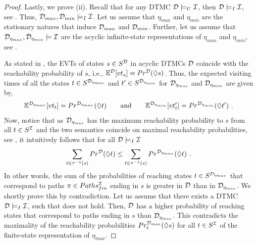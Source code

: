 \begin{proof}

    Lastly, we prove (ii).
    Recall that for any DTMC $\mathcal{D} \models_U \mathcal{I}$, then $\mathcal{D} \models_I \mathcal{I}$, see . Thus, $\mathcal{D}_{max},\mathcal{D}_{min} \models_I \mathcal{I}$. Let us assume that $\eta_{max}$ and $\eta_{min}$ are the stationary natures that induce $\mathcal{D}_{max}$ and $\mathcal{D}_{min}$. Further, let us assume that $\mathcal{D}_{\eta_{max}},\mathcal{D}_{\eta_{min}} \models \mathcal{I}$ are the acyclic infinite-state representations of $\eta_{max}$ and $\eta_{min}$, see . 

    As stated in \cite{Computing_EVTs_Stationary_Distr_in_MCs_Mertens}, the EVTs of states $s \in S^{\mathcal{D}}$ in acyclic DTMCs $\mathcal{D}$ coincide with the reachability probability of $s$, i.e., $\mathbb{E}^{\mathcal{D}}[vt_s] = Pr^{\mathcal{D}}(\lozenge s)$. 
    Thus, the expected visiting times of all the states $t\in S^{\mathcal{D}_{\eta_{max}}}$ and $t'\in S^{\mathcal{D}_{\eta_{min}}}$ for $\mathcal{D}_{\eta_{max}}$ and $\mathcal{D}_{\eta_{min}}$
    are given by, 
    \begin{equation}\label{eq:evts-of-acyclical-representations}
        \mathbb{E}^{\mathcal{D}_{\eta_{max}}}[vt_t] = Pr^{\mathcal{D}_{\eta_{max}}}(\lozenge t) \qquad \text{and} \qquad \mathbb{E}^{\mathcal{D}_{\eta_{min}}}[vt_t'] = Pr^{\mathcal{D}_{\eta_{min}}}(\lozenge t')\ .
    \end{equation}
    Now, notice that as $\mathcal{D}_{\eta_{max}}$ has the maximum reachability probability to $s$ from all $t\in S^{\mathcal{I}}$ and the two semantics coincide on maximal reachability probabilities, see , it intuitively follows that for all $\mathcal{D} \models_I \mathcal{I}$ 
    \begin{equation}\label{eq:sum_of_reach_maximal}
        \sum_{t\in \tau^{-1}(s)}Pr^{\mathcal{D}}(\lozenge t) \leq \sum_{t\in \tau^{-1}(s)}Pr^{\mathcal{D}_{\eta_{max}}}(\lozenge t)\ .
    \end{equation}
    In other words, the sum of the probabilities of reaching states $t\in S^{\mathcal{D}_{\eta_{max}}}$ that correspond to paths $\pi \in Paths_{fin}^{\mathcal{I}}$ ending in $s$ is greater in $\mathcal{D}$ than in $\mathcal{D}_{\eta_{max}}$.
    We shortly prove this by contradiction. Let us assume that there exists a DTMC $\mathcal{D}\models_I \mathcal{I}$, such that  does not hold. Then, $\mathcal{D}$ has a higher probability of reaching states that correspond to paths ending in $s$ than $\mathcal{D}_{\eta_{max}}$. This contradicts the maximality of the reachability probabilities $Pr^{\mathcal{D}_{max}}_t(\lozenge s)$ for all $t\in S^{\mathcal{I}}$ of the finite-state representation of $\eta_{max}$.


\end{proof}
